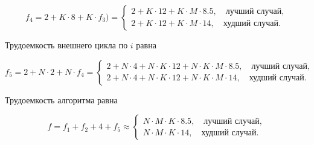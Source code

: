 \begin{equation}
	f_4 = 2 + K \cdot 8 + K \cdot f_3) = \begin{cases}
 	2 + K \cdot 12 + K \cdot M \cdot 8.5, \quad \text{лучший случай}, \\
 	2 + K \cdot 12 + K \cdot M \cdot 14, \quad \text{худший случай}.
 \end{cases}

\end{equation}

Трудоемкость внешнего цикла по $i$ равна

\begin{equation}
	f_5 = 2 + N \cdot 2 + N \cdot f_4 = \begin{cases}
 	2 + N \cdot 4 + N \cdot K \cdot 12 + N \cdot K \cdot M \cdot 8.5, \quad \text{лучший случай}, \\
 	2 + N \cdot 4 + N \cdot K \cdot 12 + N \cdot K \cdot M \cdot 14, \quad \text{худший случай}.
 \end{cases}
\end{equation}

Трудоемкость алгоритма равна

\begin{equation}
	f = f_1 + f_2 + 4 + f_5 \approx \begin{cases}
 	N \cdot M \cdot K \cdot 8.5, \quad \text{лучший случай}, \\
 	N \cdot M \cdot K \cdot 14, \quad \text{худший случай}.
 \end{cases}
\end{equation}

\newpage